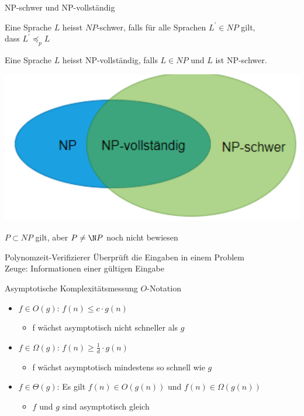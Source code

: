 \begin{concept}{NP-schwer und NP-vollständig}\\
    \begin{minipage}{0.6\linewidth}
        Eine Sprache $L$ heisst $N P$-schwer, falls für alle Sprachen $L^{\prime} \in N P$ gilt, \\dass $L^{\prime} \preccurlyeq_{p} L$
        
        Eine Sprache $L$ heisst NP-vollständig, falls $L \in N P$ und $L$ ist NP-schwer.
    \end{minipage}
    \begin{minipage}{0.38\linewidth}
        \includegraphics[width=1\linewidth]{p_vs_np.png}
    \end{minipage}
\end{concept}

\begin{remark}
    $P \subset N P $ gilt, aber $P \neq \N P$ noch nicht bewiesen
\end{remark}

\begin{definition}{Polynomzeit-Verifizierer}
    Überprüft die Eingaben in einem Problem\\
    Zeuge: Informationen einer gültigen Eingabe
\end{definition}

\begin{KR}{Asymptotische Komplexitätsmessung}
    $O$-Notation
    \begin{itemize}
        \item $f \in O(g)$: $f(n) \leq c \cdot g(n)$
        \begin{itemize}
            \item f wächst asymptotisch nicht schneller als $g$
        \end{itemize}
        \item $f \in \Omega(g)$: $f(n) \geq \frac{1}{d} \cdot g(n)$
        \begin{itemize}
            \item f wächst asymptotisch mindestens so schnell wie $g$
        \end{itemize}
        \item $f \in \Theta(g)$: Es gilt $f(n) \in O(g(n))$ und $f(n) \in \Omega(g(n))$
        \begin{itemize}
            \item $f$ und $g$ sind asymptotisch gleich
        \end{itemize}
    \end{itemize}
\end{KR}

